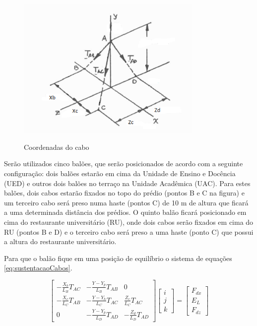 	\begin{figure}[htp]
		\centering
		\caption[Coordenadas do cabo]{Coordenadas do cabo~\cite{beer}}
		\includegraphics[width=0.8\textwidth]{figuras/coorcabo}
		\label{img:coordcabos}
	\end{figure}

	Serão utilizados cinco balões, que serão posicionados de acordo com a seguinte configuração: dois balões estarão em cima da Unidade de Ensino e Docência (UED) e outros dois balões no terraço na Unidade Acadêmica (UAC). Para estes balões, dois cabos estarão fixados no topo do prédio (pontos B e C na figura) e um terceiro cabo será preso numa haste (pontos C) de 10 m de altura que ficará a uma determinada distância dos prédios. O quinto balão ficará posicionado em cima do restaurante universitário (RU), onde dois cabos serão fixados em cima do RU (pontos B e D) e o terceiro cabo será preso a uma haste (ponto C) que possui a altura do restaurante universitário.

	Para que o balão fique em uma posição de equilíbrio o sistema de equações \eqref{eq:sustentacaoCabos}.

\begin{equacao}
	\caption{Sistema de sustentação dos cabos}
	\label{eq:sustentacaoCabos}
	\begin{equation}
		\begin{bmatrix}
			-\frac{X_b}{L_B}T_{AC} & -\frac{Y-Y_p}{L_B}T_{AB} & 0\\
			-\frac{X_c}{L_C}T_{AB} & -\frac{Y-Y_h}{L_C}T_{AC} & \frac{Z_c}{L_C}T_{AC}\\
			0 & -\frac{Y-Y_p}{L_D}T_{AD} & -\frac{Z_d}{L_D}T_{AD}
		\end{bmatrix}
		\begin{bmatrix}
			i\\
			j\\
			k
		\end{bmatrix}
		 =
		\begin{bmatrix}
			F_{dx}\\
			E_L\\
			F_{dz}
		\end{bmatrix}
	\end{equation}
\end{equacao}




